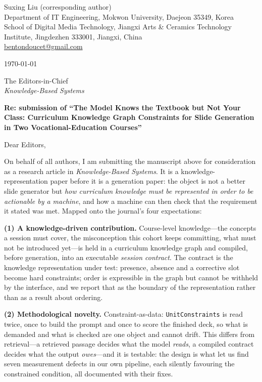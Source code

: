 \documentclass[10pt,a4paper]{article}
\begin{document}
\begin{flushright}
Suxing Liu (corresponding author)\\
Department of IT Engineering, Mokwon University, Daejeon 35349, Korea\\
School of Digital Media Technology, Jiangxi Arts \& Ceramics Technology\\
Institute, Jingdezhen 333001, Jiangxi, China\\
\href{mailto:bentondoucet@gmail.com}{bentondoucet@gmail.com}
\end{flushright}

\vspace{4pt}
\today

\vspace{4pt}
The Editors-in-Chief\\
\emph{Knowledge-Based Systems}

\vspace{2pt}
\textbf{Re: submission of ``The Model Knows the Textbook but Not Your Class:
Curriculum Knowledge Graph Constraints for Slide Generation in Two
Vocational-Education Courses''}

\vspace{2pt}
Dear Editors,

On behalf of all authors, I am submitting the manuscript above for consideration
as a research article in \emph{Knowledge-Based Systems}. It is a
knowledge-representation paper before it is a generation paper: the object is not
a better slide generator but \emph{how curriculum knowledge must be represented
in order to be actionable by a machine}, and how a machine can then check that
the requirement it stated was met. Mapped onto the journal's four expectations:

\textbf{(1) A knowledge-driven contribution.} Course-level knowledge---the
concepts a session must cover, the misconception this cohort keeps committing,
what must not be introduced yet---is held in a curriculum knowledge graph and
compiled, before generation, into an executable \emph{session contract}. The
contract is the knowledge representation under test: presence, absence and a
corrective slot become hard constraints; order is expressible in the graph but
cannot be withheld by the interface, and we report that as the boundary of the
representation rather than as a result about ordering.

\textbf{(2) Methodological novelty.} Constraint-as-data: \texttt{UnitConstraints}
is read twice, once to build the prompt and once to score the finished deck, so
what is demanded and what is checked are one object and cannot drift. This differs
from retrieval---a retrieved passage decides what the model \emph{reads}, a
compiled contract decides what the output \emph{owes}---and it is testable: the
design is what let us find seven measurement defects in our own pipeline, each
silently favouring the constrained condition, all documented with their fixes.
\end{document}

